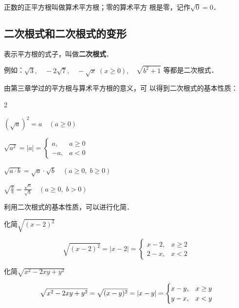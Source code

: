正数的正平方根叫做算术平方根；零的算术平方
根是零，记作$\sqrt{0}=0$．

\subsection{二次根式和二次根式的变形}
表示平方根的式子，叫做\textbf{二次根式}．

例如：$\sqrt{3},\quad -2\sqrt{7},\quad -\sqrt{x}\; (x\ge 0),\quad \sqrt{b^2+1}$
等都是二次根式．

由第三章学过的平方根与算术平方根的意义，可
以得到二次根式的基本性质：
\begin{blk}{}
    \begin{enumerate}
        \begin{multicols}{2}
        \item $\left(\sqrt{a}\right)^2=a\quad (a\ge 0)$
        \item $\sqrt{a^2}=|a|=\begin{cases}
            a, & a\ge 0\\ -a, & a<0
        \end{cases}$
        \item $\sqrt{a\cdot b}=\sqrt{a}\cdot \sqrt{b}\quad (a\ge 0,\; b\ge 0)$
        \item $\sqrt{\frac{a}{b}}=\frac{\sqrt{a}}{\sqrt{b}}\quad (a\ge 0,\; b>0)$
        \end{multicols}
       \end{enumerate}
\end{blk}

利用二次根式的基本性质，可以进行化简．


\begin{example}
    化简$\sqrt{(x-2)^2}$
\end{example}

\begin{solution}
    \[\sqrt{(x-2)^2}=|x-2|=\begin{cases}
        x-2, & x\ge2\\ 2-x, & x<2
    \end{cases}\]
\end{solution}



\begin{example}
化简$\sqrt{x^2-2xy+y^2}$    
\end{example}

\begin{solution}
    \[
\sqrt{x^2-2xy+y^2}=\sqrt{(x-y)^2}=|x-y|\\
=\begin{cases}
    x-y, & x\ge y\\
    y-x, & x<y
\end{cases}\]
\end{solution}

